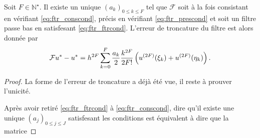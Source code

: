 \begin{theoreme}
Soit $F \in \mathbb{N}^{\star}$. Il existe un unique $(a_k)_{0 \leq k \leq F}$ tel que $\mathcal{F}$ soit à la fois consistant en vérifiant \eqref{eq:ftr_conscond}, précis en vérifiant \eqref{eq:ftr_prescond} et soit un filtre passe bas en satisfesant \eqref{eq:ftr_ftrcond}. L'erreur de troncature du filtre est alors donnée par 
\begin{equation}
\mathcal{F}u^* - u^* = h^{2F} \displaystyle\sum\limits_{k=0}^F \dfrac{a_k}{2} \dfrac{k^{2F}}{2F!} \left( u^{(2F)}(\xi_k) + u^{(2F)}(\eta_k) \right).
\end{equation}
\label{prop:filter_def}
\end{theoreme}

\begin{proof}
La forme de l'erreur de troncature a déjà été vue, il reste à prouver l'unicité.

Après avoir retiré \eqref{eq:ftr_ftrcond} à \eqref{eq:ftr_conscond}, dire qu'il existe une unique $(a_j)_{0 \leq j \leq J}$ satisfesant les conditions est équivalent à dire que la matrice


\end{proof}

